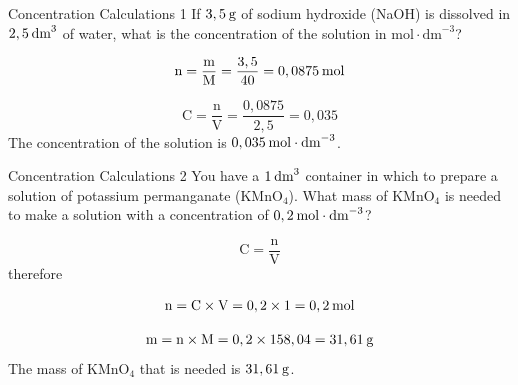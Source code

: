       \begin{wex}{ Concentration Calculations 1 }
{
      \label{m38712*probfhsst!!!underscore!!!id1654}
      \label{m38712*id283003}If $3,5\phantom{\rule{2pt}{0ex}}\text{g}$ of sodium hydroxide (NaOH) is dissolved in $2,5\phantom{\rule{2pt}{0ex}}{\text{dm}}^{3}$ of water, what is the concentration of the solution in $\text{mol}\ensuremath{\cdot}{\text{dm}}^{-3}$? 
}
{
      \label{m38712*id283067}\nopagebreak\noindent{}
    \begin{equation*}
    \text{n}=\frac{\text{m}}{\text{M}}=\frac{3,5}{40}=0,0875\phantom{\rule{2pt}{0ex}}\text{mol}
      \end{equation*}
      \label{m38712*id283121}\nopagebreak\noindent{}
        
    \begin{equation*}
    \text{C}=\frac{\text{n}}{\text{V}}=\frac{0,0875}{2,5}=0,035
      \end{equation*}
      \label{m38712*id283169}The concentration of the solution is $0,035\phantom{\rule{2pt}{0ex}}\text{mol}\ensuremath{\cdot}{\text{dm}}^{-3}$.
 
}
    \end{wex}

    \noindent
\par


      \begin{wex}{Concentration Calculations 2 }
{
You have a $1\phantom{\rule{2pt}{0ex}}{\text{dm}}^{3}$ container in which to prepare a solution of potassium permanganate ($\text{KMnO}{}_{4}$). What mass of $\text{KMnO}{}_{4}$ is needed to make a solution with a concentration of $0,2\phantom{\rule{2pt}{0ex}}\text{mol}\cdot \text{dm}^{-3}$? 
     }
{
      \label{m38712*id283297}\nopagebreak\noindent{}
        
    \begin{equation*}
    \text{C}=\frac{\text{n}}{\text{V}}
      \end{equation*}
      \label{m38712*id283318}therefore
      \label{m38712*id283321}\nopagebreak\noindent{}
        
    \begin{equation*}
    \text{n}=\text{C}\ensuremath{\times}\text{V}=0,2\ensuremath{\times}1=0,2\phantom{\rule{2pt}{0ex}}\text{mol}
      \end{equation*}
      \label{m38712*id283387}\nopagebreak\noindent{}
        
    \begin{equation*}
    \text{m}=\text{n}\ensuremath{\times}\text{M}=0,2\ensuremath{\times}158,04=31,61\phantom{\rule{2pt}{0ex}}\text{g}
      \end{equation*}
      \label{m38712*id283435}The mass of $\text{KMnO}{}_{4}$ that is needed is $31,61\phantom{\rule{2pt}{0ex}}\text{g}$.
 
}
    \end{wex}
    \noindent
\label{m38712*secfhsst!!!underscore!!!id1795} 

